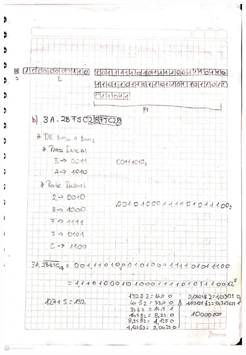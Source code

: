 \documentclass[12pt]{article}
\begin{document}
\begin{minipage}{0.95\textwidth}
    \raggedleft
    \includegraphics[width=0.95\textwidth]{inFiles/Figures/ej3.jpeg}
\end{minipage}

\vspace{0.5cm}
\end{document}
